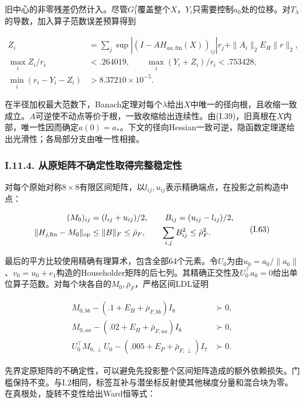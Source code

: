\documentclass[11pt,a4paper]{article}
\begin{document}
旧中心的非零残差仍然计入。尽管\(G_1^f\)覆盖整个\(X\)，\(Y_i\)只需要控制\(a_0\)处的位移。对\(T_\lambda\)的导数，加入算子范数误差预算得到

\[
\begin{aligned}
Z_i&=\sum_j\sup|(I-AH_{aa,\mathrm{fin}}(X))_{ij}|r_j
+\|A_i\|_2E_H\|r\|_2,\\
\max_i Z_i/r_i&<.264019,\qquad
\max_i(Y_i+Z_i)/r_i<.753428,\\
\min_i(r_i-Y_i-Z_i)&>8.37210\times10^{-5}.
\end{aligned}
\tag{I.62}
\]

在半径加权最大范数下，Banach定理对每个\(\lambda\)给出\(X\)中唯一的径向根，且收缩一致成立。\(A\)可逆使不动点等价于根，一致收缩给出连续性。由(I.39)，旧真根在\(X\)内部，唯一性因而确定\(a(0)=a_*\)。下文的径向Hessian一致可逆，隐函数定理遂给出光滑性；各局部分支由唯一性相接。

\subsubsection*{I.11.4.
从原矩阵不确定性取得完整稳定性}\label{i.11.4.-ux4eceux539fux77e9ux9635ux4e0dux786eux5b9aux6027ux53d6ux5f97ux5b8cux6574ux7a33ux5b9aux6027}

对每个原始对称\(8\times8\)有限区间矩阵，以\(l_{ij},u_{ij}\)表示精确端点，在投影之前构造中点：

\[
\begin{aligned}
(M_0)_{ij}&=(l_{ij}+u_{ij})/2,\qquad B_{ij}=(u_{ij}-l_{ij})/2,\\
\|H_{j,\mathrm{fin}}-M_0\|_{\rm op}&\le\|B\|_F
\le\bar\rho_F,\qquad \sum_{i,j}B_{ij}^2\le\bar\rho_F^2.
\end{aligned}
\tag{I.63}
\]

最后的平方比较使用精确有理算术，包含全部64个元素。令\(U_0\)为由\(u_0=a_0/\|a_0\|\)、\(v_0=u_0+e_1\)构造的Householder矩阵的后七列。其精确正交性及\(U_0^\top a_0=0\)给出单位算子范数。对每个块各自的\(M_0,\bar\rho_F\)，严格区间LDL证明

\[
\begin{aligned}
M_{0,bb}-(.1+E_H+\bar\rho_{F,bb})I_8&\succ0,\\
M_{0,aa}-(.02+E_H+\bar\rho_{F,aa})I_8&\succ0,\\
U_0^\top M_{0,\perp}U_0-(.005+E_P+\bar\rho_{F,\perp})I_7&\succ0.
\end{aligned}
\tag{I.64}
\]

先界定原矩阵的不确定性，可以避免先投影整个区间矩阵造成的额外依赖损失。门槛保持不变。与I.2相同，标签互补与潜坐标反射使其他梯度分量和混合块为零。在真根处，旋转不变性给出Ward恒等式：
\end{document}
